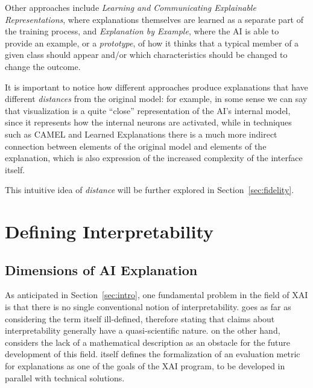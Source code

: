 \documentclass[conference]{IEEEtran}
\begin{document}

Other approaches include \textit{Learning and Communicating Explainable
    Representations}, where explanations themselves are learned as a separate
part of the training process, and \textit{Explanation by Example}, where the
AI is able to provide an example, or a \textit{prototype}, of how it thinks
that a typical member of a given class should appear and/or which
characteristics should be changed to change the outcome.


It is important to notice how different approaches produce explanations that
have different \textit{distances} from the original model: for example, in some
sense we can say that visualization is a quite ``close'' representation of the
AI's internal model, since it represents how the internal neurons are activated,
while in techniques such as CAMEL and Learned Explanations there is a much more
indirect connection between elements of the original model and elements of the
explanation, which is also expression of the increased complexity of the
interface itself.

This intuitive idea of \textit{distance} will be further explored in
Section~\ref{sec:fidelity}.

\section{Defining Interpretability}
\label{sec:explainability}

\subsection{Dimensions of AI Explanation}
\label{sec:dim}

As anticipated in Section~\ref{sec:intro}, one fundamental problem in the field
of XAI is that there is no single conventional notion of interpretability.
\citet{mythos} goes as far as considering the term itself ill-defined, therefore
stating that claims about interpretability generally have a quasi-scientific
nature. \citet{Giannotti} on the other hand, considers the lack of a
mathematical description as an obstacle for the future development of this
field. \citet{DARPA} itself defines the formalization of an evaluation metric
for explanations as one of the goals of the XAI program, to be developed in
parallel with technical solutions.
\end{document}
